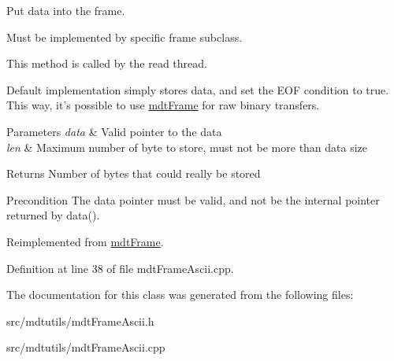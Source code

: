 Put data into the frame. 

Must be implemented by specific frame subclass.

This method is called by the read thread.

Default implementation simply stores data, and set the EOF condition to true. This way, it's possible to use \hyperlink{classmdt_frame}{mdtFrame} for raw binary transfers.


\begin{DoxyParams}{Parameters}
{\em data} & Valid pointer to the data \\
\hline
{\em len} & Maximum number of byte to store, must not be more than data size \\
\hline
\end{DoxyParams}
\begin{DoxyReturn}{Returns}
Number of bytes that could really be stored 
\end{DoxyReturn}
\begin{DoxyPrecond}{Precondition}
The data pointer must be valid, and not be the internal pointer returned by data(). 
\end{DoxyPrecond}


Reimplemented from \hyperlink{classmdt_frame_ae63af784d2fc54430ea5db4dc80b7ec8}{mdtFrame}.



Definition at line 38 of file mdtFrameAscii.cpp.



The documentation for this class was generated from the following files:\begin{DoxyCompactItemize}
\item 
src/mdtutils/mdtFrameAscii.h\item 
src/mdtutils/mdtFrameAscii.cpp\end{DoxyCompactItemize}

